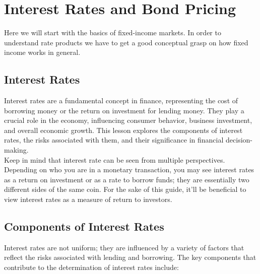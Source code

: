 \documentclass{article}
\begin{document}
\newpage
\section{Interest Rates and Bond Pricing}
\newpage
\hspace{2em}
Here we will start with the basics of fixed-income markets. In order to understand rate products we have to get a good conceptual grasp on how fixed income works in general.

\subsection{Interest Rates}
\hspace{2em}
Interest rates are a fundamental concept in finance, representing the cost of borrowing money or the return on investment for lending money. They play a crucial role in the economy, influencing consumer behavior, business investment, and overall economic growth. This lesson explores the components of interest rates, the risks associated with them, and their significance in financial decision-making.\\

Keep in mind that interest rate can be seen from multiple perspectives. Depending on who you are in a monetary transaction, you may see interest rates as a return on investment or as a rate to borrow funds; they are essentially two different sides of the same coin. For the sake of this guide, it'll be beneficial to view interest rates as a measure of return to investors. 

\subsection{Components of Interest Rates}
\hspace{2em}
Interest rates are not uniform; they are influenced by a variety of factors that reflect the risks associated with lending and borrowing. The key components that contribute to the determination of interest rates include:
\end{document}

